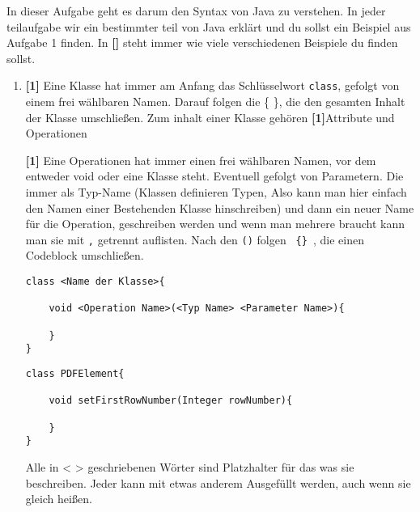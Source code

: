 
In dieser Aufgabe geht es darum den Syntax von Java zu verstehen.
In jeder teilaufgabe wir ein bestimmter teil von Java erklärt und du sollst ein Beispiel aus Aufgabe 1 finden. In \textbf{[]} steht immer wie viele verschiedenen Beispiele du finden sollst.

\begin{enumerate}
    \item \textbf{[1]} Eine Klasse hat immer am Anfang das Schlüsselwort \lstinline{class}, gefolgt von einem frei wählbaren Namen. Darauf folgen die \{ \}, die den gesamten Inhalt der Klasse umschließen.
          Zum inhalt einer Klasse gehören \textbf{[1]}Attribute und Operationen

          \textbf{[1]} Eine Operationen hat immer einen frei wählbaren Namen, vor dem entweder void oder eine Klasse steht. Eventuell gefolgt von Parametern. Die immer als Typ-Name (Klassen definieren Typen, Also kann man hier einfach den Namen einer Bestehenden Klasse hinschreiben) und dann ein neuer Name für die Operation, geschreiben werden und wenn man mehrere braucht kann man sie mit \lstinline{,} getrennt auflisten.
          Nach den \lstinline{()} folgen \texttt{ \{\} }, die einen Codeblock umschließen.

          \begin{lstlisting}[title={\textbf{Klassen Beispiel}}]
class <Name der Klasse>{
        
    void <Operation Name>(<Typ Name> <Parameter Name>){
                
    }                    
}
                \end{lstlisting}
          \begin{lstlisting}[title={\textbf{Klassen Syntax}}]
class PDFElement{
        
    void setFirstRowNumber(Integer rowNumber){
                
    }                    
}
                                    \end{lstlisting}
          Alle in < > geschriebenen Wörter sind Platzhalter für das was sie beschreiben. Jeder kann mit etwas anderem Ausgefüllt werden, auch wenn sie gleich heißen.


\end{enumerate}
